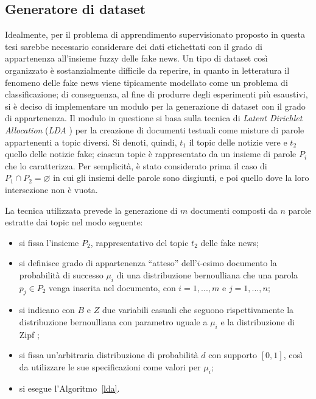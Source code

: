 \documentclass[12pt]{report}
\theoremstyle{definition}
\let\emptyset\varnothing
\begin{document}
\subsection{Generatore di dataset}\label{generator}
Idealmente, per il problema di apprendimento supervisionato proposto in questa tesi sarebbe necessario considerare dei dati etichettati con il grado di appartenenza all'insieme fuzzy delle fake news. Un tipo di dataset così organizzato è sostanzialmente difficile da reperire, in quanto in letteratura il fenomeno delle fake news viene tipicamente modellato come un problema di classificazione; di conseguenza, al fine di produrre degli esperimenti più esaustivi, si è deciso di implementare un modulo per la generazione di dataset con il grado di appartenenza. Il modulo in questione si basa sulla tecnica di \textit{Latent Dirichlet Allocation} (\textit{LDA} \cite{20}) per la creazione di documenti testuali come misture di parole appartenenti a topic diversi. 
Si denoti, quindi, $t_1$ il topic delle notizie vere e $t_2$ quello delle notizie fake; ciascun topic è rappresentato da un insieme di parole $P_i$ che lo caratterizza. Per semplicità, è stato considerato prima il caso di $P_1  \cap P_2 = \emptyset$ in cui gli insiemi delle parole sono disgiunti, e poi quello dove la loro intersezione non è vuota.

La tecnica utilizzata prevede la generazione di $m$ documenti composti da $n$ parole estratte dai topic nel modo seguente: 
\begin{itemize}
    \item si fissa l'insieme $P_2$, rappresentativo del topic $t_2$ delle fake news;
    \item si definisce grado di appartenenza ``atteso'' dell'$i$-esimo documento la probabilità di successo $\mu_i$ di una distribuzione bernoulliana che una parola $p_j \in P_2$ venga inserita nel documento, con $i=1, ..., m$ e $j=1, ..., n$;
    \item si indicano con $B$ e $Z$ due variabili casuali che seguono rispettivamente la distribuzione bernoulliana con parametro uguale a $\mu_i$ e la distribuzione di Zipf \cite{34};
    \item si fissa un'arbitraria distribuzione di probabilità $d$ con supporto $[0, 1]$, così da utilizzare le sue specificazioni come valori per $\mu_i$;
    \item si esegue l'Algoritmo~\ref{lda}.
\end{itemize}  
\end{document}
